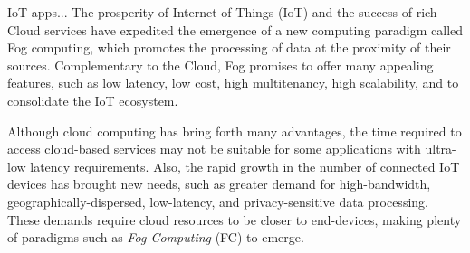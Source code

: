 IoT apps...
The prosperity of Internet of Things (IoT) and the
success of rich Cloud services have expedited the emergence of
a new computing paradigm called Fog computing, which promotes
the processing of data at the proximity of their sources.
Complementary to the Cloud, Fog promises to offer many appealing
features, such as low latency, low cost, high multitenancy, high
scalability, and to consolidate the IoT ecosystem.

\noindent\tab Although cloud computing has bring forth many advantages, the time required to access cloud-based services may not be suitable for some applications with ultra-low latency requirements. Also, the rapid growth in the number of connected IoT devices has brought new needs, such as greater demand for high-bandwidth, geographically-dispersed, low-latency, and privacy-sensitive data processing. These demands require cloud resources to be closer to end-devices, making plenty of paradigms such as \textit{Fog Computing} (FC) to emerge. %

